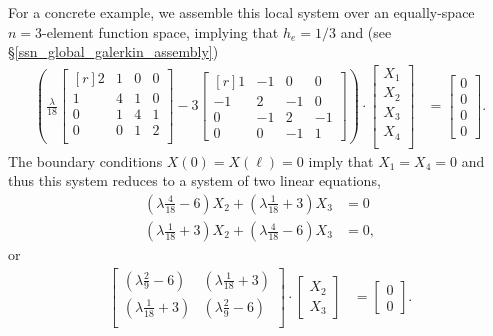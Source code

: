 For a concrete example, we assemble this local system over an equally-space $n=3$-element function space, implying that $h_e = 1/3$ and (see \S \ref{ssn_global_galerkin_assembly})
{\footnotesize
\begin{align*}
  \left( \frac{\lambda}{18} \begin{bmatrix}[r]
                              2 & 1 & 0 & 0 \\
                              1 & 4 & 1 & 0 \\
                              0 & 1 & 4 & 1 \\
                              0 & 0 & 1 & 2 \\
                            \end{bmatrix}
         - 3 \begin{bmatrix}[r]
                1 & -1 &  0 &  0 \\
               -1 &  2 & -1 &  0 \\
                0 & -1 &  2 & -1 \\
                0 &  0 & -1 &  1
             \end{bmatrix}
  \right) \cdot
  \begin{bmatrix}
    X_1 \\
    X_2 \\
    X_3 \\
    X_4 \\
  \end{bmatrix} &=
  \begin{bmatrix}
    0 \\
    0 \\
    0 \\
    0
  \end{bmatrix}.
\end{align*}}
The boundary conditions $X(0) = X(\ell) = 0$ imply that $X_1 = X_4 = 0$ and thus this system reduces to a system of two linear equations,
\begin{align*}
  \left( \lambda \frac{4}{18} - 6 \right) X_2 + \left( \lambda\frac{1}{18} + 3 \right) X_3 &= 0 \\
  \left( \lambda \frac{1}{18} + 3 \right) X_2 + \left( \lambda\frac{4}{18} - 6 \right) X_3 &= 0,
\end{align*}
or
\begin{align*}
  \begin{bmatrix}
    \left( \lambda \frac{2}{9} - 6 \right) & \left( \lambda \frac{1}{18} + 3 \right) \\
    \left( \lambda \frac{1}{18} + 3 \right) & \left( \lambda \frac{2}{9} - 6 \right) \\
  \end{bmatrix} \cdot
  \begin{bmatrix}
    X_2 \\
    X_3 
  \end{bmatrix} &=
  \begin{bmatrix}
    0 \\
    0
  \end{bmatrix}.
\end{align*}
